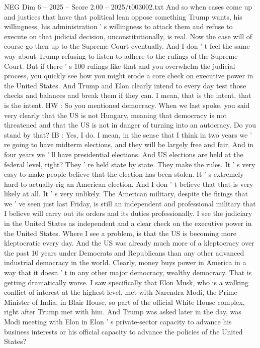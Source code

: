 \begin{textsample}{NEG Dim 6 – 2025 – Score 2.00 – 2025/t003002.txt}
And so when cases come up and justices that have that political lean oppose something Trump wants, his willingness, his administration ' s willingness to attack them and refuse to execute on that judicial decision, unconstitutionally, is real.
Now the case will of course go then up to the Supreme Court eventually.
And I don ' t feel the same way about Trump refusing to listen to adhere to the rulings of the Supreme Court.
But if there ' s 100 rulings like that and you overwhelm the judicial process, you quickly see how you might erode a core check on executive power in the United States.
And Trump and Elon clearly intend to every day test those checks and balances and break them if they can.
I mean, that is the intent, that is the intent.
HW : So you mentioned democracy.
When we last spoke, you said very clearly that the US is not Hungary, meaning that democracy is not threatened and that the US is not in danger of turning into an autocracy.
Do you stand by that?
IB : Yes, I do.
I mean, in the sense that I think in two years we ' re going to have midterm elections, and they will be largely free and fair.
And in four years we ' ll have presidential elections.
And US elections are held at the federal level, right?
They ' re held state by state.
They make the rules.
It ' s very easy to make people believe that the election has been stolen.
It ' s extremely hard to actually rig an American election.
And I don ' t believe that that is very likely at all.
It ' s very unlikely.
The American military, despite the firings that we ' ve seen just last Friday, is still an independent and professional military that I believe will carry out its orders and its duties professionally.
I see the judiciary in the United States as independent and a clear check on the executive power in the United States.
Where I see a problem, is that the US is becoming more kleptocratic every day.
And the US was already much more of a kleptocracy over the past 10 years under Democrats and Republicans than any other advanced industrial democracy in the world.
Clearly, money buys power in America in a way that it doesn ' t in any other major democracy, wealthy democracy.
That is getting dramatically worse.
I saw specifically that Elon Musk, who is a walking conflict of interest at the highest level, met with Narendra Modi, the Prime Minister of India, in Blair House, so part of the official White House complex, right after Trump met with him.
And Trump was asked later in the day, was Modi meeting with Elon in Elon ' s private-sector capacity to advance his business interests or his official capacity to advance the policies of the United States?

\end{textsample}
